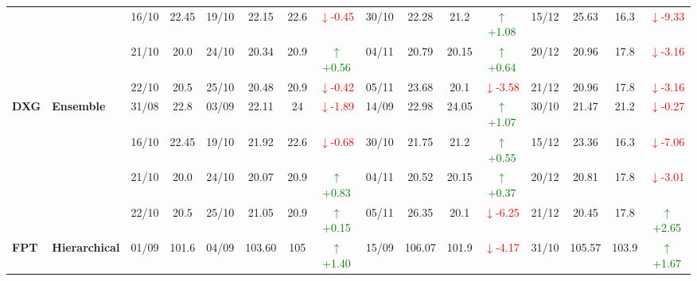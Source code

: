 \documentclass{ieeeaccess}
\begin{document}
\begin{table}[!h]
\begin{tabular}{llcc|cccc|cccc|cccc}
&
& 16/10 & 22.45 & 19/10 & 22.15 & 22.6 & \textcolor{red}{\(\downarrow\)-0.45} & 30/10 & 22.28 & 21.2 & \textcolor{green}{\(\uparrow\)+1.08} & 15/12 & 25.63 & 16.3 & \textcolor{red}{\(\downarrow\)-9.33} \\

&
& 21/10 & 20.0 & 24/10 & 20.34 & 20.9 & \textcolor{green}{\(\uparrow\)+0.56} & 04/11 & 20.79 & 20.15 & \textcolor{green}{\(\uparrow\)+0.64} & 20/12 & 20.96 & 17.8 & \textcolor{red}{\(\downarrow\)-3.16} \\

&
& 22/10 & 20.5 & 25/10 & 20.48 & 20.9 & \textcolor{red}{\(\downarrow\)-0.42} & 05/11 & 23.68 & 20.1 & \textcolor{red}{\(\downarrow\)-3.58} & 21/12 & 20.96 & 17.8 & \textcolor{red}{\(\downarrow\)-3.16} \\
\midrule


\multirow{4}{*}{\textbf{DXG}} 
& \textbf{Ensemble}
& 31/08 & 22.8 & 03/09 & 22.11 & 24 & \textcolor{red}{\(\downarrow\)-1.89} & 14/09 & 22.98 & 24.05 & \textcolor{green}{\(\uparrow\)+1.07} & 30/10 & 21.47 & 21.2 & \textcolor{red}{\(\downarrow\)-0.27} \\

&
& 16/10 & 22.45 & 19/10 & 21.92 & 22.6 & \textcolor{red}{\(\downarrow\)-0.68} & 30/10 & 21.75 & 21.2 & \textcolor{green}{\(\uparrow\)+0.55} & 15/12 & 23.36 & 16.3 & \textcolor{red}{\(\downarrow\)-7.06} \\

&
& 21/10 & 20.0 & 24/10 & 20.07 & 20.9 & \textcolor{green}{\(\uparrow\)+0.83} & 04/11 & 20.52 & 20.15 & \textcolor{green}{\(\uparrow\)+0.37} & 20/12 & 20.81 & 17.8 & \textcolor{red}{\(\downarrow\)-3.01} \\

&
& 22/10 & 20.5 & 25/10 & 21.05 & 20.9 & \textcolor{green}{\(\uparrow\)+0.15} & 05/11 & 26.35 & 20.1 & \textcolor{red}{\(\downarrow\)-6.25} & 21/12 & 20.45 & 17.8 & \textcolor{green}{\(\uparrow\)+2.65} \\
\midrule



\multirow{4}{*}{\textbf{FPT}} 
& \textbf{Hierarchical}
& 01/09 & 101.6 & 04/09 & 103.60 & 105 & \textcolor{green}{\(\uparrow\)+1.40} & 15/09 & 106.07 & 101.9 & \textcolor{red}{\(\downarrow\)-4.17} & 31/10 & 105.57 & 103.9 & \textcolor{green}{\(\uparrow\)+1.67} \\


\end{tabular}
\end{table}
\end{document}
